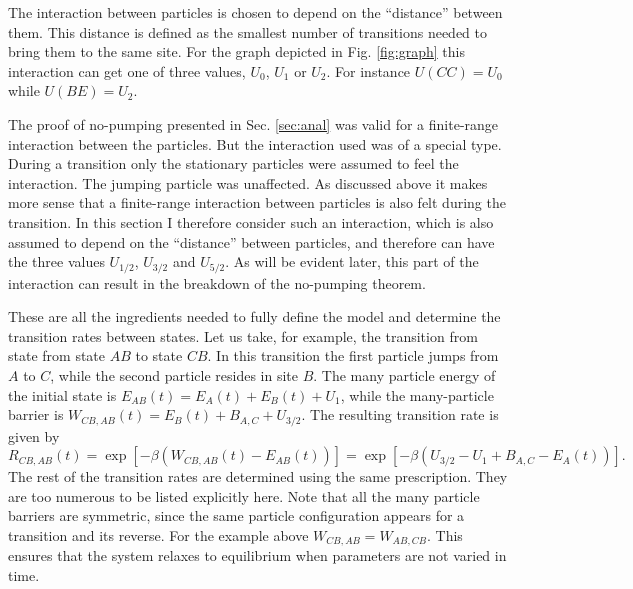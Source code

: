 \documentclass[aps,pre,showpacs,amsmath,amssymb,amsfonts,superscriptaddress,onecolumn,longbibliography]{revtex4-1}
\begin{document}
The interaction between particles is chosen to depend on the ``distance'' between them. This distance is defined as the
smallest number of transitions needed to bring them to the same site. For the graph depicted in Fig. \ref{fig:graph}
this interaction can get one of three values, $U_0$, $U_1$ or $U_2$. For instance $U(CC)=U_0$ while $U(BE)=U_2$.

The proof of no-pumping presented in Sec. \ref{sec:anal} was valid for a finite-range interaction between the particles.
But the interaction used was of a special type.
During a transition only the stationary particles were assumed to feel the interaction. The jumping particle
was unaffected.
As discussed above it makes more sense that a finite-range interaction between particles is also felt
during the transition.
 In this section I therefore consider such an interaction, which is also assumed to depend
on the ``distance'' between particles, and therefore can have the three values $U_{1/2}$, $U_{3/2}$ and $U_{5/2}$. As will be
evident later, this part of the interaction can result in the breakdown of the no-pumping theorem.

These are all the ingredients needed to fully define the model and determine the transition rates between states. Let us take, for
example, the transition from state from state $AB$ to state $CB$. In this transition
the first particle jumps from $A$ to $C$, while the second particle resides in site $B$. The many particle energy
of the initial state is $E_{AB} (t) = E_A (t) + E_B (t)+U_1$, while the many-particle barrier is $ W_{CB,AB} (t)= E_B(t) +B_{A,C}+U_{3/2}$.
The resulting transition rate is given by
\begin{equation}
  R_{CB,AB}(t)=\exp \left[-\beta \left(  W_{CB,AB} (t)-E_{AB}(t)\right) \right]=\exp \left[-\beta \left( U_{3/2}-U_1+B_{A,C}-E_A(t)\right) \right].
\end{equation}
The rest of the transition rates are determined using the same prescription. They are too numerous to be
listed explicitly here.
Note that all the many particle barriers are symmetric, since the same particle configuration appears for a transition and its reverse.
For the example above $W_{CB,AB}=W_{AB,CB}$. This ensures that the system relaxes to equilibrium when parameters are not varied in time.
\end{document}
